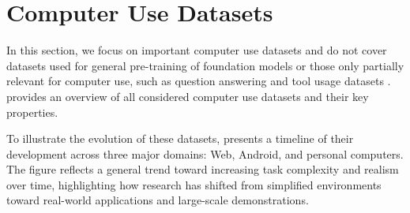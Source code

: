 
\section{Computer Use Datasets}\label{sec:datasets}
In this section, we focus on important computer use datasets and do not cover datasets used for general pre-training of foundation models or those only partially relevant for computer use, such as question answering  and tool usage datasets .
 provides an overview of all considered computer use datasets and their key properties.

To illustrate the evolution of these datasets,  presents a timeline of their development across three major domains: Web, Android, and personal computers. The figure reflects a general trend toward increasing task complexity and realism over time, highlighting how research has shifted from simplified environments toward real-world applications and large-scale demonstrations.


